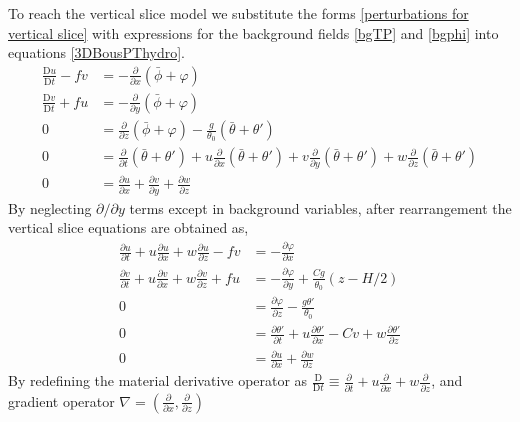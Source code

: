 \linebreak
To reach the vertical slice model we substitute the forms \ref{perturbations for vertical slice} with expressions for the background fields \ref{bgTP} and \ref{bgphi} into equations \ref{3DBousPThydro}. 
\begin{equation}
	\begin{aligned}
		\frac{\mathrm{D}u}{\mathrm{D}t}	- fv  &= -\frac{\partial}{\partial x}\left(\bar{\phi} + \varphi\right)
		\\
		\frac{\mathrm{D}v}{\mathrm{D}t}	+ fu  &= -\frac{\partial}{\partial y}\left(\bar{\phi} + \varphi\right)
		\\
		0 &=\frac{\partial}{\partial z}\left(\bar{\phi} + \varphi\right) - \frac{g}{\theta_0}\left(\bar{\theta} + \theta'\right)
		\\
		0 & =\frac{\partial }{\partial t}\left(\bar{\theta} + \theta'\right) +u\frac{\partial }{\partial x}\left(\bar{\theta} + \theta'\right) + v\frac{\partial }{\partial y}\left(\bar{\theta} + \theta'\right) + w\frac{\partial }{\partial z}\left(\bar{\theta} + \theta'\right)
		\\
		0 &= \frac{\partial u}{\partial x} + \frac{\partial v}{\partial y} + \frac{\partial w}{\partial z}
	\end{aligned}
\end{equation}
By neglecting $\partial/\partial y$ terms except in background variables, after rearrangement the vertical slice equations are obtained as,
\begin{equation}
	\begin{aligned}
		\frac{\partial u}{\partial t} + u\frac{\partial u}{\partial x} + w\frac{\partial u}{\partial z}	- fv  &= -\frac{\partial \varphi}{\partial x}
		\\
		\frac{\partial v}{\partial t} + u\frac{\partial v}{\partial x} + w\frac{\partial v}{\partial z}	+ fu  &= -\frac{\partial \varphi}{\partial y} + \frac{Cg}{\theta_0}\left(z - H/2\right)
		\\
		0 &=\frac{\partial \varphi}{\partial z} - \frac{g\theta'}{\theta_0}
		\\
		0 & =\frac{\partial \theta'}{\partial t} + u\frac{\partial \theta'}{\partial x} - Cv + w\frac{\partial \theta'}{\partial z}
		\\
		0 &= \frac{\partial u}{\partial x} + \frac{\partial w}{\partial z}
	\end{aligned} 
\label{VerticalSlice}
\end{equation}
By redefining the material derivative operator as $\frac{\mathrm{D} }{\mathrm{D} t} \equiv \frac{\partial  }{\partial t} + u\frac{\partial  }{\partial x} + w\frac{\partial  }{\partial z} $, and gradient operator $\nabla = \left(\frac{\partial }{\partial x}, \frac{\partial }{\partial z}\right)$
